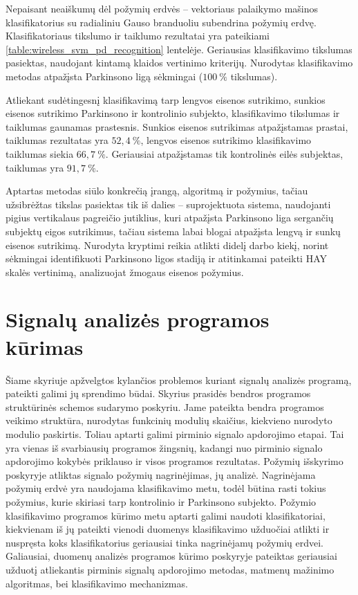 \documentclass[]{vgtuef}
\begin{document}
Nepaisant neaiškumų dėl požymių erdvės -- vektoriaus palaikymo mašinos klasifikatorius su radialiniu Gauso branduoliu subendrina požymių erdvę. Klasifikatoriaus tikslumo ir taiklumo rezultatai yra pateikiami \ref{table:wireless_svm_pd_recognition} lentelėje. Geriausias klasifikavimo tikslumas pasiektas, naudojant kintamą klaidos vertinimo kriterijų. Nurodytas klasifikavimo metodas atpažįsta Parkinsono ligą sėkmingai ($100~\%$ tikslumas).

Atliekant sudėtingesnį klasifikavimą tarp lengvos eisenos sutrikimo, sunkios eisenos sutrikimo Parkinsono ir kontrolinio subjekto, klasifikavimo tikslumas ir taiklumas gaunamas prastesnis. Sunkios eisenos sutrikimas atpažįstamas prastai, taiklumas rezultatas yra $52,4~\%$, lengvos eisenos sutrikimo klasifikavimo taiklumas siekia $66,7~\%$. Geriausiai atpažįstamas tik kontrolinės eilės subjektas, taiklumas yra $91,7~\%$.

Aptartas metodas siūlo konkrečią įrangą, algoritmą ir požymius, tačiau užsibrėžtas tikslas pasiektas tik iš dalies -- suprojektuota sistema, naudojanti pigius vertikalaus pagreičio jutiklius, kuri atpažįsta Parkinsono liga sergančių subjektų eigos sutrikimus, tačiau sistema labai blogai atpažįsta lengvą ir sunkų eisenos sutrikimą. Nurodyta kryptimi reikia atlikti didelį darbo kiekį, norint sėkmingai identifikuoti Parkinsono ligos stadiją ir atitinkamai pateikti HAY skalės vertinimą, analizuojat žmogaus eisenos požymius.

\section{Signalų analizės programos kūrimas}


Šiame skyriuje apžvelgtos kylančios problemos kuriant signalų analizės programą, pateikti galimi jų sprendimo būdai. Skyrius prasidės bendros programos struktūrinės schemos sudarymo poskyriu. Jame pateikta bendra programos veikimo struktūra, nurodytas funkcinių modulių skaičius, kiekvieno nurodyto modulio paskirtis. Toliau aptarti galimi pirminio signalo apdorojimo etapai. Tai yra vienas iš svarbiausių programos žingsnių, kadangi nuo pirminio signalo apdorojimo kokybės priklauso ir visos programos rezultatas. Požymių išskyrimo poskyryje atliktas signalo požymių nagrinėjimas, jų analizė. Nagrinėjama požymių erdvė yra naudojama klasifikavimo metu, todėl būtina rasti tokius požymius, kurie skiriasi tarp kontrolinio ir Parkinsono subjekto. Požymio klasifikavimo programos kūrimo metu aptarti galimi naudoti klasifikatoriai, kiekvienam iš jų pateikti vienodi duomenys klasifikavimo užduočiai atlikti ir nuspręsta koks klasifikatorius geriausiai tinka nagrinėjamų požymių erdvei. Galiausiai, duomenų analizės programos kūrimo poskyryje pateiktas geriausiai užduotį atliekantis pirminis signalų apdorojimo metodas, matmenų mažinimo algoritmas, bei klasifikavimo mechanizmas.
\end{document}
